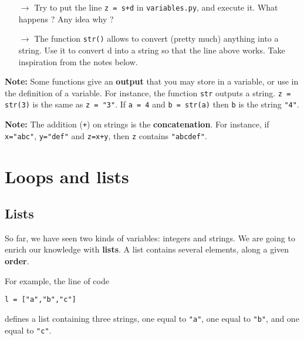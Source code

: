 \documentclass{article}
\begin{document}
\begin{mdframed}[backgroundcolor=black!20!white]
\begin{itemize}
\item[$\rightarrow$] Try to put the line \texttt{z = s+d} in \texttt{variables.py}, and execute it. What happens ?
Any idea why ?
\item[$\rightarrow$] The function \texttt{str()} allows to convert (pretty much) anything
into a string. Use it to convert d into a string so that the line above works.
Take inspiration from the notes below.
\end{itemize}
\end{mdframed}

\begin{mdframed}[backgroundcolor=green!30!white]
\textbf{Note:} Some functions give an \textbf{output} that you may store in a
variable, or use in the definition of a variable. For instance, the
function \texttt{str} outputs a string. \texttt{z = str(3)} is the 
same as \texttt{z = "3"}. If \texttt{a = 4} and \texttt{b = str(a)}
then \texttt{b} is the string \texttt{"4"}.
\end{mdframed}

\begin{mdframed}[backgroundcolor=green!30!white]
\textbf{Note: } The addition (\texttt{+}) on strings is the \textbf{concatenation}.
For instance, if \texttt{x="abc"}, \texttt{y="def"} and \texttt{z=x+y},
then \texttt{z} contains \texttt{"abcdef"}.
\end{mdframed}

\section{Loops and lists}

\subsection{Lists}

So far, we have seen two kinds of variables: integers and strings. We are
going to enrich our knowledge with \textbf{lists}. A list contains
several elements, along a given \textbf{order}.

For example, the line of code
\begin{center}
    {\tt l = ["a","b","c"]}
\end{center}

defines a list containing three strings, one equal to {\tt "a"}, one equal
to {\tt "b"}, and one equal to {\tt "c"}.
\end{document}
